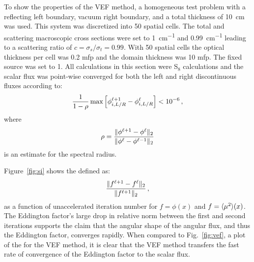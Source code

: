 To show the properties of the VEF method, a homogeneous test problem with a reflecting left boundary, vacuum right boundary, and a total thickness of \SI{10}{cm} was used. This system was discretized into 50 spatial cells. The total and scattering macroscopic cross sections were set to \SI{1}{cm^{-1}} and \SI{0.99}{cm^{-1}} leading to a scattering ratio of $c = \sigma_s/\sigma_t=0.99.$ With 50 spatial cells the optical thickness per cell was 0.2 mfp and the domain thickness was 10 mfp. The fixed source was set to \SI{1}{}. All calculations in this section were S$_8$ calculations and the scalar flux was point-wise converged for both the left and right discontinuous fluxes according to:
	\begin{equation} 
		\frac{1}{1 - \rho}\max\left[ \phi_{i,L/R}^{\ell+1} - \phi_{i,L/R}^\ell \right] < \num{e-6} \,,
	\end{equation}
where 
	\begin{equation}
		\rho = \frac{\| \phi^{\ell+1} - \phi^\ell \|_2}{\| \phi^\ell - \phi^{\ell-1} \|_2}
	\end{equation}
is an estimate for the spectral radius. 

Figure~\ref{fig:si} shows the  defined as:
	\begin{equation}
		\frac{\| f^{\ell+1} - f^\ell \|_2}{\| f^{\ell+1} \|_2 } \,,
	\end{equation}	
as a function of unaccelerated iteration number for $f = \phi(x)$ and $f = \langle \mu^2 \rangle(x)$. The Eddington factor's large drop in relative norm between the first and second iterations supports the claim that the angular shape of the angular flux, and thus the Eddington factor, converges rapidly. When compared to Fig.~\ref{fig:vef}, a plot of the  for the VEF method, it is clear that the VEF method transfers the fast rate of convergence of the Eddington factor to the scalar flux. 




